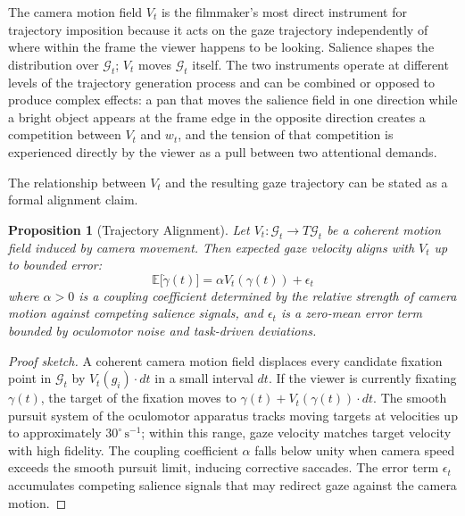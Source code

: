 \documentclass[12pt, a4paper]{article}
\theoremstyle{plain}
\newtheorem{proposition}[theorem]{Proposition}
\theoremstyle{definition}
\theoremstyle{remark}
\newcommand{\G}{\mathcal{G}}
\newcommand{\traj}{\gamma}
\newcommand{\salience}{w}
\begin{document}
\medskip
The camera motion field $V_t$ is the filmmaker's most
direct instrument for trajectory imposition because it
acts on the gaze trajectory independently of where within
the frame the viewer happens to be looking. Salience shapes
the distribution over $\G_t$; $V_t$ moves $\G_t$ itself.
The two instruments operate at different levels of the
trajectory generation process and can be combined or
opposed to produce complex effects: a pan that moves the
salience field in one direction while a bright object
appears at the frame edge in the opposite direction
creates a competition between $V_t$ and $\salience_t$,
and the tension of that competition is experienced directly
by the viewer as a pull between two attentional demands.

The relationship between $V_t$ and the resulting gaze
trajectory can be stated as a formal alignment claim.

\begin{proposition}[Trajectory Alignment]
\label{prop:trajectory_alignment}
  Let $V_t : \G_t \to T\G_t$ be a coherent motion field
  induced by camera movement. Then expected gaze velocity
  aligns with $V_t$ up to bounded error:
  \begin{equation}
    \mathbb{E}\bigl[\dot{\traj}(t)\bigr]
    = \alpha V_t(\traj(t)) + \epsilon_t
  \end{equation}
  where $\alpha > 0$ is a coupling coefficient determined
  by the relative strength of camera motion against
  competing salience signals, and $\epsilon_t$ is a
  zero-mean error term bounded by oculomotor noise and
  task-driven deviations.
\end{proposition}

\begin{proof}[Proof sketch]
  A coherent camera motion field displaces every candidate
  fixation point in $\G_t$ by $V_t(g_i) \cdot dt$ in
  a small interval $dt$. If the viewer is currently
  fixating $\traj(t)$, the target of the fixation moves
  to $\traj(t) + V_t(\traj(t)) \cdot dt$. The smooth
  pursuit system of the oculomotor apparatus tracks moving
  targets at velocities up to approximately
  $30^\circ\,\text{s}^{-1}$; within this range, gaze
  velocity matches target velocity with high fidelity.
  The coupling coefficient $\alpha$ falls below unity when
  camera speed exceeds the smooth pursuit limit, inducing
  corrective saccades. The error term $\epsilon_t$
  accumulates competing salience signals that may redirect
  gaze against the camera motion.
\end{proof}
\end{document}
